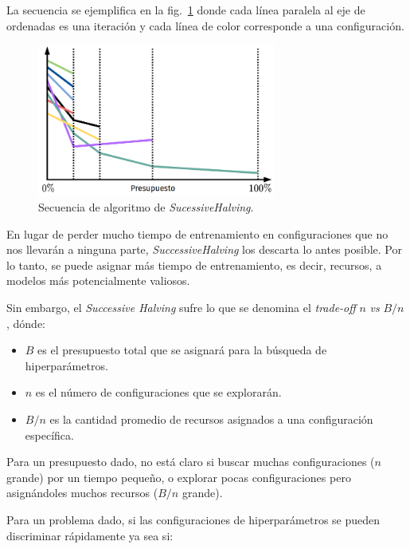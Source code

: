 \documentclass[a4paper,12pt]{article}
\begin{document}
La secuencia se ejemplifica en la fig.~\ref{fig:sh} donde cada línea paralela al eje de ordenadas es una iteración y cada línea de color corresponde a una configuración.

\begin{figure}[H]
	\begin{center}
		\includegraphics[width=0.7\textwidth]{sucessive_halving.png}
		\caption{Secuencia de algoritmo de \textit{SucessiveHalving}.}
		\label{fig:sh}
	\end{center}
\end{figure}

En lugar de perder mucho tiempo de entrenamiento en configuraciones que no nos llevarán a ninguna parte, \textit{SuccessiveHalving} los descarta lo antes posible. Por lo tanto, se puede asignar más tiempo de entrenamiento, es decir, recursos, a modelos más potencialmente valiosos.

\clearpage

Sin embargo, el \textit{Successive Halving} sufre lo que se denomina el \textit{trade-off} $n$ \textit{vs} $B/n$ \citep{Bissuel2019Apr}, dónde:
\begin{itemize}[noitemsep, topsep=2pt]
	\item $B$ es el presupuesto total que se asignará para la búsqueda de hiperparámetros.
	\item $n$ es el número de configuraciones que se explorarán.
	\item $B/n$ es la cantidad promedio de recursos asignados a una configuración específica.
\end{itemize}

Para un presupuesto dado, no está claro si buscar muchas configuraciones ($n$ grande) por un tiempo pequeño, o explorar pocas configuraciones pero asignándoles muchos recursos ($B/n$ grande). 

Para un problema dado, si las configuraciones de hiperparámetros se pueden discriminar rápidamente ya sea si:
\end{document}
